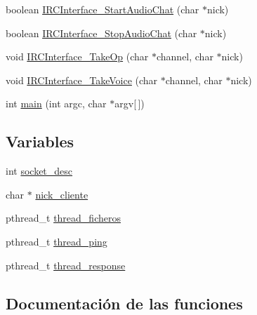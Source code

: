 \begin{DoxyCompactItemize}
\item 
boolean \hyperlink{G-2313-06-P2__client_8c_a5dc7a44587e609b416a783cd420a12e3}{I\+R\+C\+Interface\+\_\+\+Start\+Audio\+Chat} (char $\ast$nick)
\item 
boolean \hyperlink{G-2313-06-P2__client_8c_a754a3d3dd311194637c07cc701e7d507}{I\+R\+C\+Interface\+\_\+\+Stop\+Audio\+Chat} (char $\ast$nick)
\item 
void \hyperlink{G-2313-06-P2__client_8c_a4e2a1ea75e59306142030a91a054b7e6}{I\+R\+C\+Interface\+\_\+\+Take\+Op} (char $\ast$channel, char $\ast$nick)
\item 
void \hyperlink{G-2313-06-P2__client_8c_a2ff2e10ed1cb1a399293b6f76ac1e5ae}{I\+R\+C\+Interface\+\_\+\+Take\+Voice} (char $\ast$channel, char $\ast$nick)
\item 
int \hyperlink{G-2313-06-P2__client_8c_a0ddf1224851353fc92bfbff6f499fa97}{main} (int argc, char $\ast$argv\mbox{[}$\,$\mbox{]})
\end{DoxyCompactItemize}
\subsection*{Variables}
\begin{DoxyCompactItemize}
\item 
int \hyperlink{G-2313-06-P2__client_8c_adeadf7cb6916a10c7142ce7d265ab32a}{socket\+\_\+desc}
\item 
char $\ast$ \hyperlink{G-2313-06-P2__client_8c_ab93a317ee9a27c82844c9128a76b136a}{nick\+\_\+cliente}
\item 
pthread\+\_\+t \hyperlink{G-2313-06-P2__client_8c_a497238a5c30172237878376d95472ce4}{thread\+\_\+ficheros}
\item 
pthread\+\_\+t \hyperlink{G-2313-06-P2__client_8c_a081c16d23aa5029dd2454dfb0c355eb0}{thread\+\_\+ping}
\item 
pthread\+\_\+t \hyperlink{G-2313-06-P2__client_8c_a2b3ce8d8dc4bda71d7bd4a3b47fffd9d}{thread\+\_\+response}
\end{DoxyCompactItemize}


\subsection{Documentación de las funciones}
